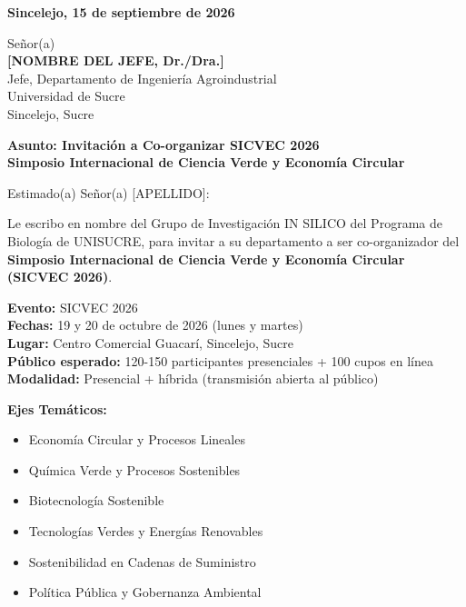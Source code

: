 \documentclass[12pt,a4paper]{article}
\begin{document}
\vspace{1cm}

\noindent
\textbf{Sincelejo, 15 de septiembre de 2026}

\vspace{1.5cm}

\noindent
Señor(a)\\
\textbf{[NOMBRE DEL JEFE, Dr./Dra.]}\\
Jefe, Departamento de Ingeniería Agroindustrial\\
Universidad de Sucre\\
Sincelejo, Sucre

\vspace{1.5cm}

\noindent
\textbf{\large Asunto: Invitación a Co-organizar SICVEC 2026}\\
\textbf{\large Simposio Internacional de Ciencia Verde y Economía Circular}

\vspace{1.5cm}

Estimado(a) Señor(a) [APELLIDO]:

\vspace{0.8cm}

Le escribo en nombre del Grupo de Investigación IN SILICO del Programa de Biología de UNISUCRE, para invitar a su departamento a ser co-organizador del \textbf{Simposio Internacional de Ciencia Verde y Economía Circular (SICVEC 2026)}.

\vspace{0.8cm}

\textbf{Evento:} SICVEC 2026\\
\textbf{Fechas:} 19 y 20 de octubre de 2026 (lunes y martes)\\
\textbf{Lugar:} Centro Comercial Guacarí, Sincelejo, Sucre\\
\textbf{Público esperado:} 120-150 participantes presenciales + 100 cupos en línea\\
\textbf{Modalidad:} Presencial + híbrida (transmisión abierta al público)

\vspace{1cm}

\textbf{Ejes Temáticos:}
\begin{itemize}
  \item Economía Circular y Procesos Lineales
  \item Química Verde y Procesos Sostenibles
  \item Biotecnología Sostenible
  \item Tecnologías Verdes y Energías Renovables
  \item Sostenibilidad en Cadenas de Suministro
  \item Política Pública y Gobernanza Ambiental
\end{itemize}
\end{document}
